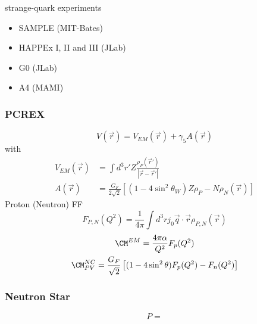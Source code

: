 strange-quark experiments
\begin{itemize}
    \item SAMPLE (MIT-Bates)
    \item HAPPEx I, II and III (JLab)
    \item G0 (JLab)
    \item A4 (MAMI)
\end{itemize}


\subsubsection{PCREX}
\begin{equation*}
    V(\vec{r}) = V_{EM}(\vec{r}) + \gamma_5 A(\vec{r})
\end{equation*}
with
\begin{equation*}
    \begin{aligned}
	V_{EM}(\vec{r}) &= \int d^3r' Z \frac{\rho_P(\vec{r}')}{|\vec{r} - \vec{r}'|} \\
	A(\vec{r}) &= \frac{G_F}{2\sqrt{2}}\left[ (1-4\sin^2\theta_W) Z \rho_P - N\rho_N(\vec{r}) \right]
    \end{aligned}
\end{equation*}
Proton (Neutron) FF
\begin{equation*}
    F_{P,N}(Q^2) = \frac{1}{4\pi}\int d^3r j_0{\vec{q}\cdot\vec{r}} \rho_{P, N}(\vec{r})
\end{equation*}
\begin{equation*}
    \begin{gathered}
	\CM^{EM} = \frac{4\pi\alpha}{Q^2} F_p(Q^2)	\\
	\CM^{NC}_{PV} = \frac{G_F}{\sqrt{2}} \left[ (1-4\sin^2\theta) F_p(Q^2) - F_n(Q^2) \right] \\
    \end{gathered}
\end{equation*}


\subsubsection{Neutron Star}
\begin{equation}
    P = 
\end{equation}
